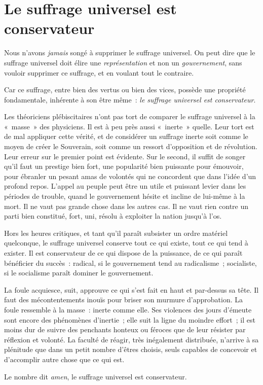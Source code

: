 \documentclass[french,twoside]{book} %
\begin{document}
\section[Le suffrage universel est conservateur]{Le suffrage universel est conservateur}
\noindent Nous n’avons \emph{jamais} songé à supprimer le suffrage universel. On peut dire que le suffrage universel doit élire une \emph{représentation} et non un \emph{gouvernement}, sans vouloir supprimer ce suffrage, et en voulant tout le contraire.\par
Car ce suffrage, entre bien des vertus ou bien des vices, possède une propriété fondamentale, inhérente à son être même : \emph{le suffrage universel est conservateur}.\par
Les théoriciens plébiscitaires n’ont pas tort de comparer le suffrage universel à la « masse » des physiciens. Il est à peu près aussi « inerte » quelle. Leur tort est de mal appliquer cette vérité, et de considérer un suffrage inerte soit comme le moyen de créer le Souverain, soit comme un ressort d’opposition et de révolution. Leur erreur sur le premier point est évidente. Sur le second, il suffit de songer qu’il faut un prestige bien fort, une popularité bien puissante pour émouvoir, pour ébranler un pesant amas de volontés qui ne concordent que dans l’idée d’un profond repos. L’appel au peuple peut être un utile et puissant levier dans les périodes de trouble, quand le gouvernement hésite et incline de lui-même à la mort. Il ne vaut pas grande chose dans les autres cas. Il ne vaut rien contre un parti bien constitué, fort, uni, résolu à exploiter la nation jusqu’à l’os.\par
Hors les heures critiques, et tant qu’il paraît subsister un ordre matériel quelconque, le suffrage universel conserve tout ce qui existe, tout ce qui tend à exister. Il est conservateur de ce qui dispose de la puissance, de ce qui paraît bénéficier du succès : radical, si le gouvernement tend au radicalisme ; socialiste, si le socialisme paraît dominer le gouvernement.\par
La foule acquiesce, suit, approuve ce qui s’est fait en haut et par-dessus sa tête. Il faut des mécontentements inouïs pour briser son murmure d’approbation. La foule ressemble à la masse : inerte comme elle. Ses violences des jours d’émeute sont encore des phénomènes d’inertie ; elle suit la ligne du moindre effort ; il est moins dur de suivre des penchants honteux ou féroces que de leur résister par réflexion et volonté. La faculté de réagir, très inégalement distribuée, n’arrive à sa plénitude que dans un petit nombre d’êtres choisis, seuls capables de concevoir et d’accomplir autre chose que ce qui est.\par
Le nombre dit \emph{amen}, le suffrage universel est conservateur.
\end{document}

